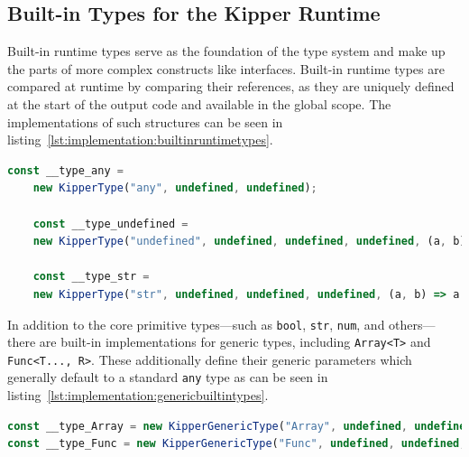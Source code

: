 \subsection{Built-in Types for the Kipper Runtime}
\label{subsec:builtintypes}

Built-in runtime types serve as the foundation of the type system and make up the parts of more complex constructs like interfaces. Built-in runtime types are compared at runtime by comparing their references, as they are uniquely defined at the start of the output code and available in the global scope. The implementations of such structures can be seen in listing~\ref{lst:implementation:builtinruntimetypes}.

\begin{lstlisting}[language=TypeScript,caption=Examples for the built-in runtime types,label=lst:implementation:builtinruntimetypes]
	const __type_any =
	new KipperType("any", undefined, undefined);

	const __type_undefined =
	new KipperType("undefined", undefined, undefined, undefined, (a, b) => a.name === b.name);

	const __type_str =
	new KipperType("str", undefined, undefined, undefined, (a, b) => a.name === b.name);
\end{lstlisting}

In addition to the core primitive types—such as \lstinline|bool|, \lstinline|str|, \lstinline|num|, and others—there are built-in implementations for generic types, including \lstinline|Array<T>| and  \lstinline|Func<T..., R>|. These additionally define their generic parameters which generally default to a standard \lstinline|any| type as can be seen in listing~\ref{lst:implementation:genericbuiltintypes}.

\begin{lstlisting}[language=Typescript,caption=Generic built-in types,label=lst:implementation:genericbuiltintypes]
const __type_Array = new KipperGenericType("Array", undefined, undefined, {T: __type_any});
const __type_Func = new KipperGenericType("Func", undefined, undefined, {T: [], R: __type_any});
\end{lstlisting}

